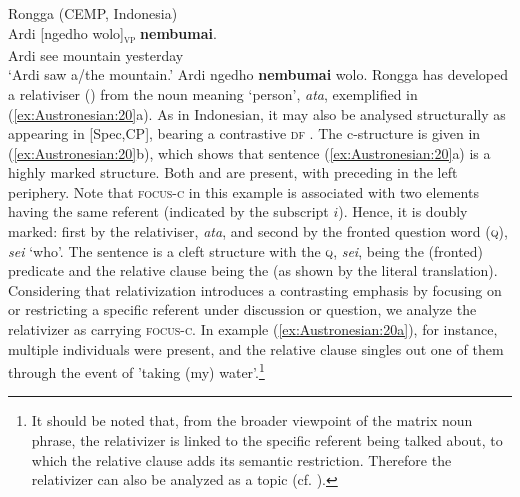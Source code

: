 \documentclass[output=paper,chinesefont]{../langscibook}
\begin{document}
\ea\label{ex:Austronesian:19} Rongga (CEMP, Indonesia) \citep[192]{Arka2016}\\
 \ea\gll
 Ardi [ngedho wolo]\textsubscript{\textsc{vp}} \textbf{nembumai}.\\
 Ardi \phantom{[}see mountain yesterday\\
\glt`Ardi saw a/the mountain.'
\ex *Ardi ngedho \textbf{nembumai} wolo.
\z\z
Rongga has developed a relativiser (\REL) from the noun meaning `person', \emph{ata}, exemplified in (\ref{ex:Austronesian:20}a). As in Indonesian, it may also be analysed structurally as appearing in [Spec,CP], bearing a contrastive \textsc{df} \citep{Arka2016}. The c-structure is given in (\ref{ex:Austronesian:20}b), which shows that sentence (\ref{ex:Austronesian:20}a) is a highly marked structure. Both \TOPIC and \FOC are present, with \TOPIC preceding \FOC in the left periphery. Note that \textsc{focus-c} in this example is associated with two elements having the same referent (indicated by the subscript $i$). Hence, it is doubly marked: first by the relativiser, \emph{ata}, and second by the fronted question word (\textsc{q}), \emph{sei} `who'. The sentence is a cleft structure with the \textsc{q}, \emph{sei}, being the (fronted) predicate and the relative clause being the \SUBJ(as shown by the literal translation). Considering that relativization introduces a contrasting emphasis by focusing on or restricting a specific referent under discussion or question, we analyze the relativizer as carrying \textsc{focus-c}. In example (\ref{ex:Austronesian:20a}), for instance, multiple individuals were present, and the relative clause singles out one of them through the event of 'taking (my) water'.\footnote{It should be noted that, from the broader viewpoint of the matrix noun phrase, the relativizer is linked to the specific referent being talked about, to which the relative clause adds its semantic restriction. Therefore the relativizer can also be analyzed as a topic (cf. \citealt{BM87}).}
\end{document}
